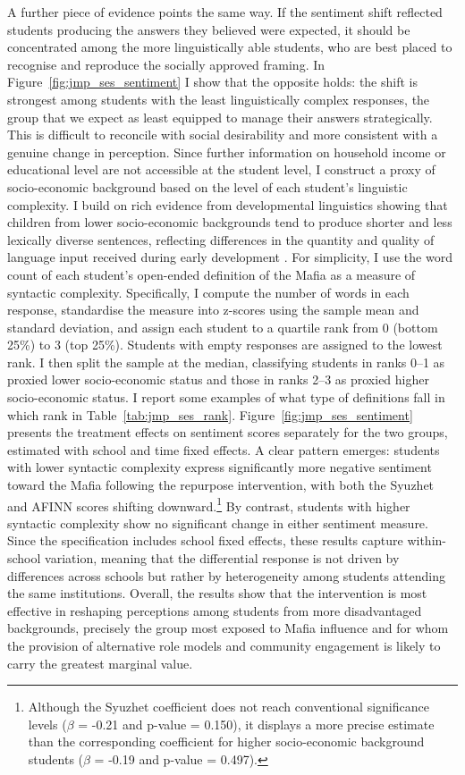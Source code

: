 \documentclass[12pt]{article}
\theoremstyle{plain}
\theoremstyle{plain}
\theoremstyle{plain}
\theoremstyle{definition}
\theoremstyle{plain}
\theoremstyle{definition}
\theoremstyle{plain}
\theoremstyle{remark}
\theoremstyle{definition}
\theoremstyle{definition}
\theoremstyle{plain}
\begin{document}
A further piece of evidence points the same way. If the sentiment shift reflected students producing the answers they believed were expected, it should be concentrated among the more linguistically able students, who are best placed to recognise and reproduce the socially approved framing. In Figure~\ref{fig:jmp_ses_sentiment} I show that the opposite holds: the shift is strongest among students with the least linguistically complex responses, the group that we expect as least equipped to manage their answers strategically. This is difficult to reconcile with social desirability and more consistent with a genuine change in perception. Since further information on household income or educational level are not accessible at the student level, I construct a proxy of socio-economic background based on the level of each student's linguistic complexity. I build on rich evidence from developmental linguistics showing that children from lower socio-economic backgrounds tend to produce shorter and less lexically diverse sentences, reflecting differences in the quantity and quality of language input received during early development \citep{huttenlocher_sources_2010, spencer_language_2012}. For simplicity, I use the word count of each student's open-ended definition of the Mafia as a measure of syntactic complexity. Specifically, I compute the number of words in each response, standardise the measure into z-scores using the sample mean and standard deviation, and assign each student to a quartile rank from 0 (bottom 25\%) to 3 (top 25\%). Students with empty responses are assigned to the lowest rank. I then split the sample at the median, classifying students in ranks 0–1 as proxied lower socio-economic status and those in ranks 2–3 as proxied higher socio-economic status. I report some examples of what type of definitions fall in which rank in Table~\ref{tab:jmp_ses_rank}. 
Figure~\ref{fig:jmp_ses_sentiment} presents the treatment effects on sentiment scores separately for the two groups, estimated with school and time fixed effects. A clear pattern emerges: students with lower syntactic complexity express significantly more negative sentiment toward the Mafia following the repurpose intervention, with both the Syuzhet and AFINN scores shifting downward.\footnote{Although the Syuzhet coefficient does not reach conventional significance levels ($\beta$ = -0.21 and p-value = 0.150), it displays a more precise estimate than the corresponding coefficient for higher socio-economic background students ($\beta$ = -0.19 and p-value = 0.497).} By contrast, students with higher syntactic complexity show no significant change in either sentiment measure. Since the specification includes school fixed effects, these results capture within-school variation, meaning that the differential response is not driven by differences across schools but rather by heterogeneity among students attending the same institutions. Overall, the results show that the intervention is most effective in reshaping perceptions among students from more disadvantaged backgrounds, precisely the group most exposed to Mafia influence and for whom the provision of alternative role models and community engagement is likely to carry the greatest marginal value.
\end{document}
